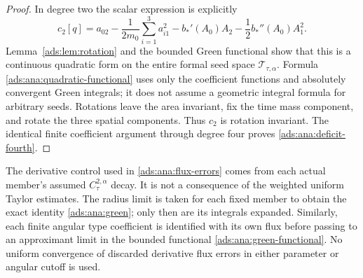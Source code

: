 \begin{proof}
In degree two the scalar expression is explicitly
\begin{equation}
 c_2[q]=a_{02}
       -\frac1{2m_0}\sum_{i=1}^3a_{i1}^2
       -b_*'(A_0)A_2-\frac12b_*''(A_0)A_1^2.
 \label{ads:ana:quadratic-functional}
\end{equation}
Lemma~\ref{ads:lem:rotation} and the bounded Green functional show that
this is a continuous quadratic form on the entire formal seed space
$\mathscr T_{\tau,\alpha}$.  Formula \eqref{ads:ana:quadratic-functional}
uses only the coefficient functions and absolutely convergent Green
integrals; it does not assume a geometric integral formula for
arbitrary seeds.  Rotations leave the area invariant, fix the time
mass component, and rotate the three spatial components.  Thus $c_2$
is rotation invariant.  The identical finite coefficient argument
through degree four proves \eqref{ads:ana:deficit-fourth}.
\end{proof}

\begin{remark}
\label{ads:ana:order-of-limits}
The derivative control used in \eqref{ads:ana:flux-errors} comes from each
actual member's assumed $C^{2,\alpha}_\tau$ decay.  It is not a
consequence of the weighted uniform Taylor estimates.  The radius
limit is taken for each fixed member to obtain the exact identity
\eqref{ads:ana:green}; only then are its integrals expanded.  Similarly,
each finite angular type coefficient is identified with its own flux
before passing to an approximant limit in the bounded functional
\eqref{ads:ana:green-functional}.  No uniform convergence of discarded
derivative flux errors in either parameter or angular cutoff is used.
\end{remark}
